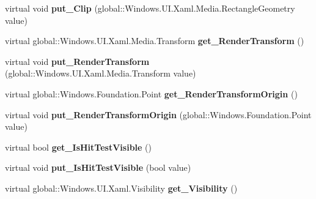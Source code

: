 \begin{DoxyCompactItemize}
\item 
\mbox{\label{class_windows_1_1_u_i_1_1_xaml_1_1_u_i_element_aa47613e3e5d780689f098981803a451d}} 
virtual void {\bfseries put\+\_\+\+Clip} (global\+::\+Windows.\+U\+I.\+Xaml.\+Media.\+Rectangle\+Geometry value)
\item 
\mbox{\label{class_windows_1_1_u_i_1_1_xaml_1_1_u_i_element_a9556f4a073076052be93c39cd96cb6a0}} 
virtual global\+::\+Windows.\+U\+I.\+Xaml.\+Media.\+Transform {\bfseries get\+\_\+\+Render\+Transform} ()
\item 
\mbox{\label{class_windows_1_1_u_i_1_1_xaml_1_1_u_i_element_af319cc6e684f42a4fb4719f262cf5f5d}} 
virtual void {\bfseries put\+\_\+\+Render\+Transform} (global\+::\+Windows.\+U\+I.\+Xaml.\+Media.\+Transform value)
\item 
\mbox{\label{class_windows_1_1_u_i_1_1_xaml_1_1_u_i_element_a160f3818573614194babfda698182355}} 
virtual global\+::\+Windows.\+Foundation.\+Point {\bfseries get\+\_\+\+Render\+Transform\+Origin} ()
\item 
\mbox{\label{class_windows_1_1_u_i_1_1_xaml_1_1_u_i_element_a3384cc317262d95a77573d76f771778d}} 
virtual void {\bfseries put\+\_\+\+Render\+Transform\+Origin} (global\+::\+Windows.\+Foundation.\+Point value)
\item 
\mbox{\label{class_windows_1_1_u_i_1_1_xaml_1_1_u_i_element_acafd318a1c0b56bfb701aec3a210bec1}} 
virtual bool {\bfseries get\+\_\+\+Is\+Hit\+Test\+Visible} ()
\item 
\mbox{\label{class_windows_1_1_u_i_1_1_xaml_1_1_u_i_element_a91c0826f6d39080d6e6c6bca0144cdb1}} 
virtual void {\bfseries put\+\_\+\+Is\+Hit\+Test\+Visible} (bool value)
\item 
\mbox{\label{class_windows_1_1_u_i_1_1_xaml_1_1_u_i_element_a28fb7dc5ba5e68bbf934a134e97777f2}} 
virtual global\+::\+Windows.\+U\+I.\+Xaml.\+Visibility {\bfseries get\+\_\+\+Visibility} ()

\end{DoxyCompactItemize}
